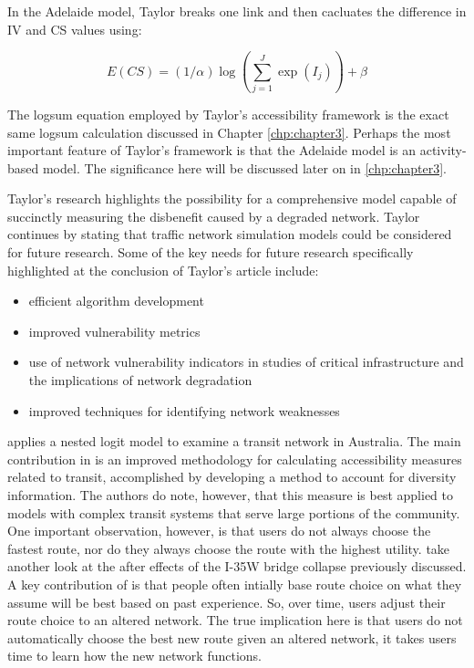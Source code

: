 In the Adelaide model, Taylor breaks one link and
then cacluates the difference in IV and CS values using:

	\begin{equation}
		E(CS) = (1/\alpha) \log (\sum_{j = 1}^{J} \exp (I_j)) + \beta
			\label{eqn:taylor}
	\end{equation}

The logsum equation employed by Taylor's accessibility framework is the exact
same logsum calculation discussed in Chapter \ref{chp:chapter3}. Perhaps the
most important feature of Taylor's framework is that the Adelaide model is an
activity-based model. The significance here will be discussed later on in \ref{chp:chapter3}.

Taylor's research highlights the possibility for a comprehensive model capable
of succinctly measuring the disbenefit caused by a degraded network.
Taylor continues by stating that traffic network simulation models
could be considered for future research. Some of the key needs for
future research specifically highlighted at the conclusion of Taylor's article include:

	\begin{itemize}
		\item efficient algorithm development
		\item improved vulnerability metrics
		\item use of network vulnerability indicators in studies of critical
		infrastructure and the implications of network degradation
		\item improved techniques for identifying network weaknesses
	\end{itemize}


\citet{Nassir2016} applies a nested logit model to examine a transit
network in Australia. The main contribution in \citet{Nassir2016} is an
improved methodology for calculating accessibility measures related to
transit, accomplished by developing a method to account for diversity
information. The authors do note, however, that this measure is best applied
to models with complex transit systems that serve large portions of the
community. One important observation, however, is that users do not always
choose the fastest route, nor do they always choose the route with the
highest utility. \citet{He2012} take another look at the after effects of
the I-35W bridge collapse previously discussed. A key contribution of
\citet{He2012} is that people often intially base route choice on what they
assume will be best based on past experience. So, over time, users
adjust their route choice to an altered network. The true implication here
is that users do not automatically choose the best new route given an
altered network, it takes users time to learn how the new network
functions.

